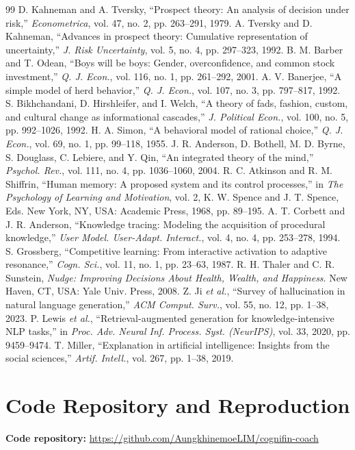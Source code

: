 \documentclass[conference]{IEEEtran}
\begin{document}
\begin{thebibliography}{99}
 D. Kahneman and A. Tversky, ``Prospect theory: An analysis of decision under risk,'' \textit{Econometrica}, vol. 47, no. 2, pp. 263--291, 1979.
 A. Tversky and D. Kahneman, ``Advances in prospect theory: Cumulative representation of uncertainty,'' \textit{J. Risk Uncertainty}, vol. 5, no. 4, pp. 297--323, 1992.
 B. M. Barber and T. Odean, ``Boys will be boys: Gender, overconfidence, and common stock investment,'' \textit{Q. J. Econ.}, vol. 116, no. 1, pp. 261--292, 2001.
 A. V. Banerjee, ``A simple model of herd behavior,'' \textit{Q. J. Econ.}, vol. 107, no. 3, pp. 797--817, 1992.
 S. Bikhchandani, D. Hirshleifer, and I. Welch, ``A theory of fads, fashion, custom, and cultural change as informational cascades,'' \textit{J. Political Econ.}, vol. 100, no. 5, pp. 992--1026, 1992.
 H. A. Simon, ``A behavioral model of rational choice,'' \textit{Q. J. Econ.}, vol. 69, no. 1, pp. 99--118, 1955.
 J. R. Anderson, D. Bothell, M. D. Byrne, S. Douglass, C. Lebiere, and Y. Qin, ``An integrated theory of the mind,'' \textit{Psychol. Rev.}, vol. 111, no. 4, pp. 1036--1060, 2004.
 R. C. Atkinson and R. M. Shiffrin, ``Human memory: A proposed system and its control processes,'' in \textit{The Psychology of Learning and Motivation}, vol. 2, K. W. Spence and J. T. Spence, Eds. New York, NY, USA: Academic Press, 1968, pp. 89--195.
 A. T. Corbett and J. R. Anderson, ``Knowledge tracing: Modeling the acquisition of procedural knowledge,'' \textit{User Model. User-Adapt. Interact.}, vol. 4, no. 4, pp. 253--278, 1994.
 S. Grossberg, ``Competitive learning: From interactive activation to adaptive resonance,'' \textit{Cogn. Sci.}, vol. 11, no. 1, pp. 23--63, 1987.
 R. H. Thaler and C. R. Sunstein, \textit{Nudge: Improving Decisions About Health, Wealth, and Happiness}. New Haven, CT, USA: Yale Univ. Press, 2008.
 Z. Ji \textit{et al.}, ``Survey of hallucination in natural language generation,'' \textit{ACM Comput. Surv.}, vol. 55, no. 12, pp. 1--38, 2023.
 P. Lewis \textit{et al.}, ``Retrieval-augmented generation for knowledge-intensive NLP tasks,'' in \textit{Proc. Adv. Neural Inf. Process. Syst. (NeurIPS)}, vol. 33, 2020, pp. 9459--9474.
 T. Miller, ``Explanation in artificial intelligence: Insights from the social sciences,'' \textit{Artif. Intell.}, vol. 267, pp. 1--38, 2019.
\end{thebibliography}
\appendices
\section{Code Repository and Reproduction}
\textbf{Code repository:} \url{https://github.com/AungkhinemoeLIM/cognifin-coach}
\end{document}
